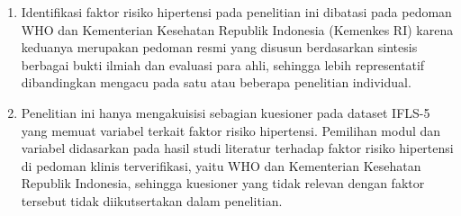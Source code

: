 \begin{enumerate}
\item Identifikasi faktor risiko hipertensi pada penelitian ini dibatasi pada pedoman WHO dan Kementerian Kesehatan Republik Indonesia (Kemenkes RI) karena keduanya merupakan pedoman resmi yang disusun berdasarkan sintesis berbagai bukti ilmiah dan evaluasi para ahli, sehingga lebih representatif dibandingkan mengacu pada satu atau beberapa penelitian individual.
\item Penelitian ini hanya mengakuisisi sebagian kuesioner pada dataset IFLS-5 yang memuat variabel terkait faktor risiko hipertensi. Pemilihan modul dan variabel didasarkan pada hasil studi literatur terhadap faktor risiko hipertensi di pedoman klinis terverifikasi, yaitu WHO dan Kementerian Kesehatan Republik Indonesia, sehingga kuesioner yang tidak relevan dengan faktor tersebut tidak diikutsertakan dalam penelitian.
\end{enumerate}

